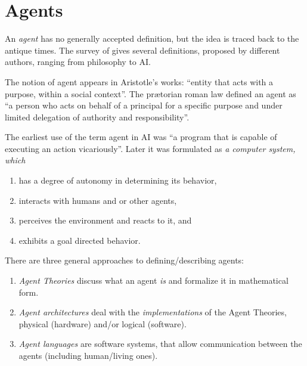 \section{Agents}
\medskip

\def\domain{\mathrm{domain}}
\def\pop{\mathrm{pop}}

\def\behaviour{\mathrm{behaviour}}
\def\act{\mathrm{act}}
\def\react{\mathrm{react}}
\def\state{\mathrm{state}}
\def\action{\mathrm{action}}
\def\msg{\mathrm{message}}

\medskip

An \emph{agent} has no generally accepted definition, but the idea is traced back
to the antique times. The survey of \cite[sec.~2.2]{PNoriega} gives several
definitions, proposed by different authors, ranging from philosophy to AI.

The notion of agent appears in Aristotle's works:
 ``entity that acts with a purpose, within a social context''.
The prætorian roman law defined an agent as
``a person who acts on behalf of a principal for
a specific purpose and under limited delegation of authority and responsibility''.

The earliest use of the term agent in AI was
``a program that is capable of executing an action vicariously''.
Later it was formulated as \emph{a computer system, which}
\begin{enumerate}
  \item has a degree of autonomy in determining its behavior,
  \item interacts with humans and or other agents,
  \item perceives the environment and reacts to it, and
  \item exhibits a goal directed behavior.
\end{enumerate}

\bigskip

There are three general approaches to defining/describing agents:
\begin{enumerate}
  \item \emph{Agent Theories} discuss what an agent \emph{is} and formalize
    it in mathematical form.
  \item \emph{Agent architectures} deal with the \emph{implementations}
    of the Agent Theories, physical (hardware) and/or logical (software).
  \item \emph{Agent languages} are software systems, that allow communication
    between the agents (including human/living ones).
\end{enumerate}


